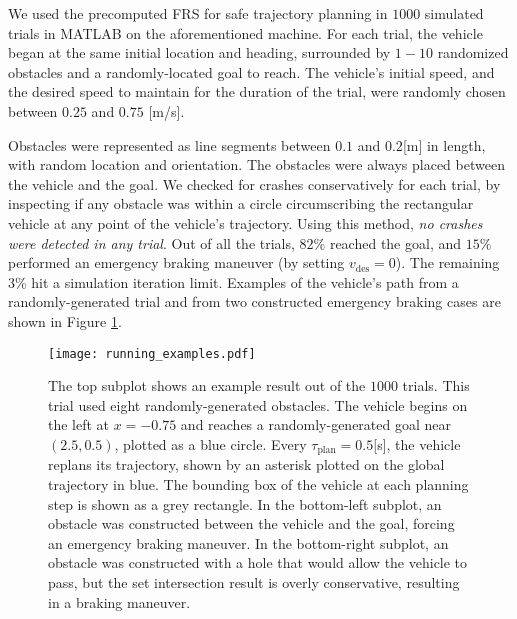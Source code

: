 We used the precomputed FRS for safe trajectory planning in $1000$ simulated trials in MATLAB on the aforementioned machine.
For each trial, the vehicle began at the same initial location and heading, surrounded by $1-10$ randomized obstacles and a randomly-located goal to reach.
The vehicle's initial speed, and the desired speed to maintain for the duration of the trial, were randomly chosen between $0.25$ and $0.75$ [m/s].


Obstacles were represented as line segments between $0.1$ and $0.2$[m] in length, with random location and orientation.
The obstacles were always placed between the vehicle and the goal.
We checked for crashes conservatively for each trial, by inspecting if any obstacle was within a circle circumscribing the rectangular vehicle at any point of the vehicle's trajectory. 
Using this method, \emph{no crashes were detected in any trial}.
Out of all the trials, $82\%$ reached the goal, and $15\%$ performed an emergency braking maneuver (by setting $v_\text{des} = 0$). 
The remaining 3\% hit a simulation iteration limit.
Examples of the vehicle's path from a randomly-generated trial and from two constructed emergency braking cases are shown in Figure \ref{fig:example_trial}.


\begin{figure}
\centering
\texttt{[image: running\_examples.pdf]}
\caption{The top subplot shows an example result out of the $1000$ trials.
This trial used eight randomly-generated obstacles.
The vehicle begins on the left at $x = -0.75$ and reaches a randomly-generated goal near $(2.5, 0.5)$, plotted as a blue circle.
Every $\tau_\text{plan} = 0.5$[s], the vehicle replans its trajectory, shown by an asterisk plotted on the global trajectory in blue.
The bounding box of the vehicle at each planning step is shown as a grey rectangle. In the bottom-left subplot, an obstacle was constructed between the vehicle and the goal, forcing an emergency braking maneuver. In the bottom-right subplot, an obstacle was constructed with a hole that would allow the vehicle to pass, but the set intersection result is overly conservative, resulting in a braking maneuver.}
\label{fig:example_trial}
\end{figure}

